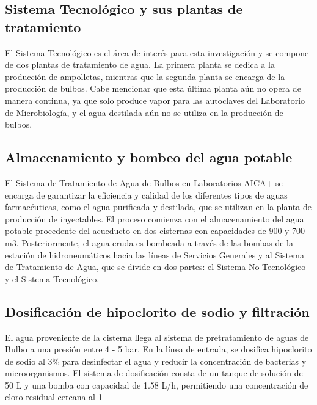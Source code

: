 
\subsection*{Sistema Tecnológico y sus plantas de tratamiento}

El Sistema Tecnológico es el área de interés para esta investigación y se compone de dos plantas de tratamiento de agua. La primera planta se dedica a la producción de ampolletas, mientras que la segunda planta se encarga de la producción de bulbos. Cabe mencionar que esta última planta aún no opera de manera continua, ya que solo produce vapor para las autoclaves del Laboratorio de Microbiología, y el agua destilada aún no se utiliza en la producción de bulbos.


\subsection{Almacenamiento y bombeo del agua potable}

El Sistema de Tratamiento de Agua de Bulbos en Laboratorios AICA+ se encarga de garantizar la eficiencia y calidad de los diferentes tipos de aguas farmacéuticas, como el agua purificada y destilada, que se utilizan en la planta de producción de inyectables. El proceso comienza con el almacenamiento del agua potable procedente del acueducto en dos cisternas con capacidades de 900 y 700 m3. Posteriormente, el agua cruda es bombeada a través de las bombas de la estación de hidroneumáticos hacia las líneas de Servicios Generales y al Sistema de Tratamiento de Agua, que se divide en dos partes: el Sistema No Tecnológico y el Sistema Tecnológico.


\subsection{Dosificación de hipoclorito de sodio y filtración}

El agua proveniente de la cisterna llega al sistema de pretratamiento de aguas de Bulbo a una presión entre 4 - 5 bar. En la línea de entrada, se dosifica hipoclorito de sodio al 3\% para desinfectar el agua y reducir la concentración de bacterias y microorganismos. El sistema de dosificación consta de un tanque de solución de 50 L y una bomba con capacidad de 1.58 L/h, permitiendo una concentración de cloro residual cercana al 1%


